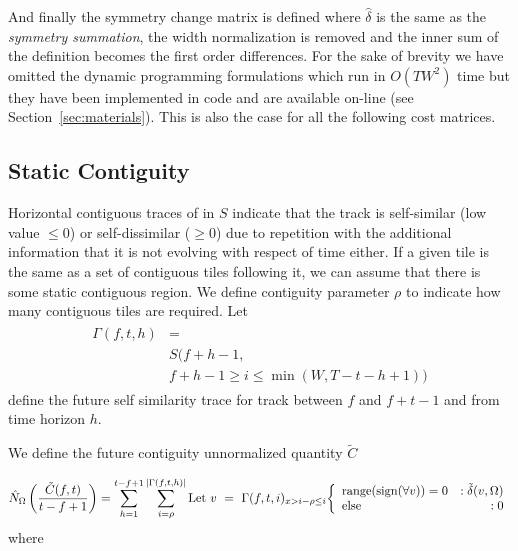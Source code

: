 \documentclass[twocolumn]{article}
\begin{document}
	And finally the symmetry change matrix is defined where $\hat \delta$ is the same as the \textit{symmetry summation}, the width normalization is removed and the inner sum of the definition becomes the first order differences. For the sake of brevity we have omitted the dynamic programming formulations which run in $O(TW^2)$ time but they have been implemented in code and are available on-line (see Section~\ref{sec:materials}). This is also the case for all the following cost matrices.
	
	\subsection{Static Contiguity}
	
	Horizontal contiguous traces of in $S$ indicate that the track is self-similar (low value $\le 0$) or self-dissimilar ($\ge 0$) due to repetition with the additional information that it is not evolving with respect of time either. If a given tile is the same as a set of contiguous tiles following it, we can assume that there is some static contiguous region. We define contiguity parameter $\rho$ to indicate how many contiguous tiles are required. Let 
\begin{align*}
\begin{array}{ll}
\Gamma( f,t,h ) &= \\
& S( f + h - 1, \\ 
& f + h - 1 \ge i \le \min( W, T-t-h+1 ) )
\end{array}
\end{align*} define the future self similarity trace for track between $f$ and $f+t-1$ and from time horizon $h$.
	
	We define the future contiguity unnormalized quantity $\tilde C$
	
\begin{dmath*} \hat N_\Omega \left( \frac{ \tilde C(f, t) }{t-f+1} \right) =  
	\sum_{h=1}^{t-f+1} 
	\sum_{i=\rho}^{|\Gamma( f,t,h )|} \\ \mathrm{Let}~v~=~\Gamma( f,t,i )_{x > i-\rho \le i }  \\  { \left\{ 
		\begin{array}{lr}
			\mathrm{range}( \mathrm{sign}( \forall  v ) )=0  & : \tilde \delta( v, \Omega )   \\
			\mathrm{else} & : 0  \\
		\end{array}
		\right.}
\end{dmath*}  where  
\end{document}
